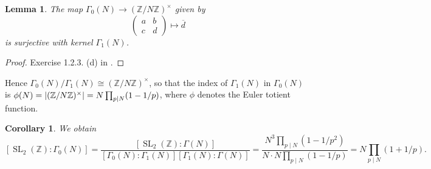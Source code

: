 \documentclass[10pt,leqno]{article}
\theoremstyle{plain}
\newtheorem{lemma}[lem]{Lemma}
\newtheorem{corollary}[lem]{Corollary}
\theoremstyle{definition}
\numberwithin{equation}{section}
\numberwithin{lem}{section}
\DeclareMathOperator{\SL}{SL}
\newcommand{\smod}[1]{\;(\bmod\; #1)}
\newcommand{\abcd}{\begin{pmatrix}
    a & b \\ c & d
\end{pmatrix}}
\newcommand{\slz}{\SL_2(\mathbb{Z})}
\begin{document}
\begin{lemma}
    The map $\varGamma_0(N)\to (\mathbb{Z}/N\mathbb{Z})^\times$ given by \[\abcd\mapsto \overline d\] 
    is surjective with kernel $\varGamma_1(N)$.
\end{lemma}
\begin{proof}
    Exercise 1.2.3. (d) in \cite{diamond}.%
\end{proof}
Hence $\varGamma_0(N)/\varGamma_1(N)\cong (\mathbb{Z}/N\mathbb{Z})^\times$, so that the index of $\varGamma_1(N)$ in $\varGamma_0(N)$ is $\phi(N) = \abs{(\mathbb{Z}/N\mathbb{Z})^\times} = N\prod_{p\mid N}(1-1/p)$, where $\phi$ denotes the Euler totient function. 
\begin{corollary}
    We obtain \[[\slz : \varGamma_0(N)] = \frac{[\slz : \varGamma(N)]}{[\varGamma_0(N) : \varGamma_1(N)][\varGamma_1(N) : \varGamma(N)]} = \frac{N^3\prod_{p\mid N}(1-1/p^2)}{N\cdot N\prod_{p\mid N}(1-1/p)} = N\prod_{p\mid N}(1+1/p).\]
\end{corollary} 
\end{document}
